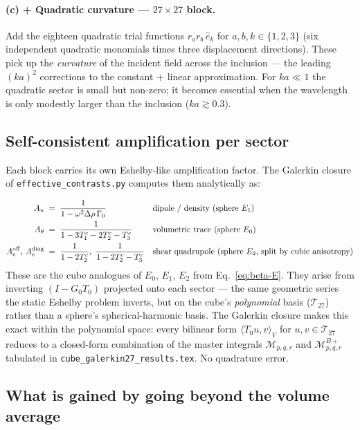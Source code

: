 \documentclass[11pt,a4paper]{article}
\newcommand{\D}{\Delta}
\newcommand{\code}[1]{\texttt{#1}}
\begin{document}
\paragraph{(c) + Quadratic curvature --- $27\times 27$ block.}
Add the eighteen quadratic trial functions $r_a r_b \,\hat{e}_k$ for
$a,b,k\in\{1,2,3\}$ (six independent quadratic monomials times three
displacement directions).  These pick up the \emph{curvature} of the
incident field across the inclusion --- the leading $(ka)^2$ corrections
to the constant + linear approximation.  For $ka\ll 1$ the quadratic
sector is small but non-zero; it becomes essential when the wavelength
is only modestly larger than the inclusion ($ka \gtrsim 0.3$).

\subsection{Self-consistent amplification per sector}

{\sloppy
Each block carries its own Eshelby-like amplification factor.
The Galerkin closure of \code{effective\_contrasts.py} computes them
analytically as:\par}
\begin{align}
A_u        &\;=\; \frac{1}{1-\omega^2 \D\rho \,\Gamma_0}
                  &&\text{dipole / density (sphere $E_1$)} \\
A_\theta   &\;=\; \frac{1}{1-3 T_1^c - 2 T_2^c - T_3^c}
                  &&\text{volumetric trace (sphere $E_0$)} \\
A_e^{\rm off},\, A_e^{\rm diag}
           &\;=\; \frac{1}{1-2 T_2^c},\; \frac{1}{1-2 T_2^c-T_3^c}
                  &&\text{shear quadrupole (sphere $E_2$, split by cubic anisotropy)}
\end{align}
These are the cube analogues of $E_0$, $E_1$, $E_2$ from
Eq.~\eqref{eq:beta-E}.  They arise from inverting $(I-G_0 T_0)$
projected onto each sector --- the same geometric series the static
Eshelby problem inverts, but on the cube's \emph{polynomial} basis
($\mathcal{T}_{27}$) rather than a sphere's spherical-harmonic basis.
The Galerkin closure makes this exact within the polynomial space:
every bilinear form $\langle T_0 u, v\rangle_V$ for $u, v\in
\mathcal{T}_{27}$ reduces to a closed-form combination of the master
integrals $\mathcal{M}_{p,q,r}$ and $\mathcal{M}^{B+}_{p,q,r}$
tabulated in \code{cube\_galerkin27\_results.tex}.  No quadrature
error.

\subsection{What is gained by going beyond the volume average}
\end{document}
